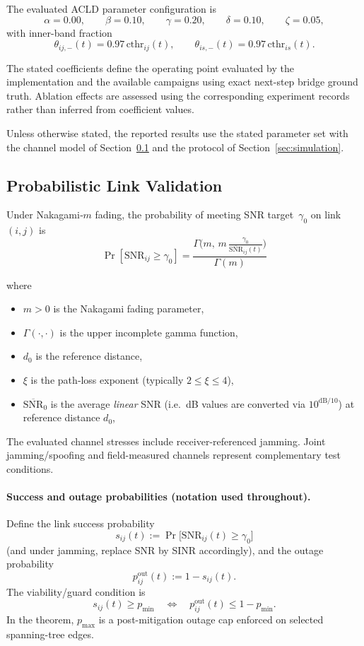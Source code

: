\documentclass[preprint,12pt]{elsarticle}
\newcommand{\plExp}{\xi}
\theoremstyle{definition}\newtheorem{definition}{Definition}
\theoremstyle{plain}\newtheorem{theorem}{Theorem}
\theoremstyle{plain}\newtheorem{lemma}{Lemma}
\theoremstyle{plain}\newtheorem{corollary}{Corollary}
\theoremstyle{plain}\newtheorem{assumption}{Assumption}
\theoremstyle{remark}\newtheorem{remark}[theorem]{Remark}
\begin{document}
The evaluated ACLD parameter configuration is
\[
  \alpha = 0.00,\qquad
  \beta = 0.10,\qquad
  \gamma = 0.20,\qquad
  \delta = 0.10,\qquad
  \zeta = 0.05,
\]
with inner-band fraction
\[
  \theta_{ij,-}(t)=0.97\,\mathrm{cthr}_{ij}(t),
  \qquad
  \theta_{is,-}(t)=0.97\,\mathrm{cthr}_{is}(t).
\]

The stated coefficients define the operating point evaluated by the implementation and the available campaigns using exact next-step bridge ground truth. Ablation effects are assessed using the corresponding experiment records rather than inferred from coefficient values.

Unless otherwise stated, the reported results use the stated parameter set with the channel model of Section~\ref{subsec:prob_link_validation} and the protocol of Section~\ref{sec:simulation}.

\subsection{Probabilistic Link Validation}
\label{subsec:prob_link_validation}
Under Nakagami‐$m$ fading, the probability of meeting SNR target~$\gamma_0$ on link~$(i,j)$ is
\begin{equation}
  \Pr[\mathrm{SNR}_{ij}\ge\gamma_0] =
  \frac{\Gamma\!\bigl(m,\,m\,\frac{\gamma_0}{\overline{\mathrm{SNR}}_{ij}(t)}\bigr)}
       {\Gamma(m)}
  \label{eq:pr_snr}
\end{equation}

where
\begin{itemize}[nosep]
  \item $m>0$ is the Nakagami fading parameter,
  \item $\Gamma(\cdot,\cdot)$ is the upper incomplete gamma function,
  \item $d_0$ is the reference distance,
  \item $\plExp$ is the path‐loss exponent (typically $2\le\plExp\le4$),
  \item $\overline{\mathrm{SNR}}_0$ is the average \emph{linear} SNR (i.e.\ dB values are converted via $10^{\mathrm{dB}/10}$) at reference distance $d_0$,
\end{itemize}

The evaluated channel stresses include receiver-referenced jamming. Joint jamming/spoofing and field-measured channels represent complementary test conditions.

\paragraph{Success and outage probabilities (notation used throughout).}
Define the link success probability
\[
  s_{ij}(t) := \Pr\!\big[\mathrm{SNR}_{ij}(t)\ge \gamma_0\big]
\]
(and under jamming, replace SNR by SINR accordingly), and the outage probability
\[
  p^{\mathrm{out}}_{ij}(t) := 1 - s_{ij}(t).
\]
The viability/guard condition is
\[
  s_{ij}(t)\ge p_{\min}
  \quad \Longleftrightarrow \quad
  p^{\mathrm{out}}_{ij}(t)\le 1-p_{\min}.
\]
In the theorem, \(p_{\max}\) is a post-mitigation outage cap enforced on selected spanning-tree edges.
\end{document}
